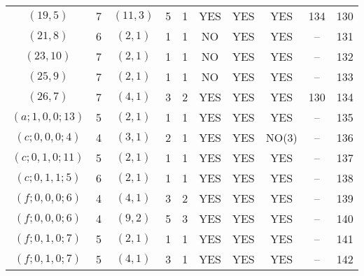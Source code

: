 \begin{longtable}{|c|c|c|c|c|c|c|c|c|c|}
$(19, 5)$ & 7 & $(11, 3)$ & 5 & 1 & YES & YES & YES & 134 & 130\\
$(21, 8)$ & 6 & $(2, 1)$ & 1 & 1 & NO & YES & YES & -- & 131\\
$(23, 10)$ & 7 & $(2, 1)$ & 1 & 1 & NO & YES & YES & -- & 132\\
$(25, 9)$ & 7 & $(2, 1)$ & 1 & 1 & NO & YES & YES & -- & 133\\
$(26, 7)$ & 7 & $(4, 1)$ & 3 & 2 & YES & YES & YES & 130 & 134\\
$(a; 1, 0, 0; 13)$ & 5 & $(2, 1)$ & 1 & 1 & YES & YES & YES & -- & 135\\
$(c; 0, 0, 0; 4)$ & 4 & $(3, 1)$ & 2 & 1 & YES & YES & NO(3) & -- & 136\\
$(c; 0, 1, 0; 11)$ & 5 & $(2, 1)$ & 1 & 1 & YES & YES & YES & -- & 137\\
$(c; 0, 1, 1; 5)$ & 6 & $(2, 1)$ & 1 & 1 & YES & YES & YES & -- & 138\\
$(f; 0, 0, 0; 6)$ & 4 & $(4, 1)$ & 3 & 2 & YES & YES & YES & -- & 139\\
$(f; 0, 0, 0; 6)$ & 4 & $(9, 2)$ & 5 & 3 & YES & YES & YES & -- & 140\\
$(f; 0, 1, 0; 7)$ & 5 & $(2, 1)$ & 1 & 1 & YES & YES & YES & -- & 141\\
$(f; 0, 1, 0; 7)$ & 5 & $(4, 1)$ & 3 & 1 & YES & YES & YES & -- & 142
\end{longtable}
